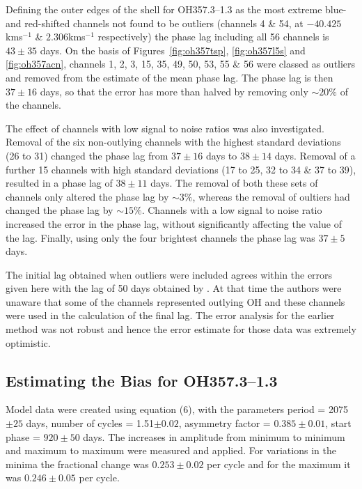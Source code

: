 \documentclass[usenatbib,usegraphicx]{mn2e}
\begin{document}
Defining the outer edges of the shell for OH357.3--1.3 as the most extreme
blue- and red-shifted channels not found to be outliers (channels 4 \& 54,
at $-40.425$kms$^{-1}$ \& $2.306$kms$^{-1}$ respectively) the phase lag
including all 56 channels is $43\pm35$ days. On the basis of
Figures~\ref{fig:oh357tsp}, \ref{fig:oh357l5s} and \ref{fig:oh357acn},
channels 1, 2, 3, 15, 35, 49, 50, 53, 55 \& 56 were classed as outliers and
removed from the estimate of the mean phase lag.  The phase lag is then
$37\pm16$ days, so that the error has more than halved by removing only
$\sim20\%$ of the channels.


The effect of channels with low signal to noise ratios was also
investigated.  Removal of the six non-outlying channels with the highest
standard deviations (26 to 31) changed the phase lag from $37\pm16$ days to
$38\pm14$ days.  Removal of a further 15 channels with high standard
deviations (17 to 25, 32 to 34 \& 37 to 39), resulted in a phase lag of
$38\pm11$ days. The removal of both these sets of channels only altered the
phase lag by $\sim3\%$, whereas the removal of oultiers had changed the
phase lag by $\sim15\%$.  Channels with a low signal to noise ratio
increased the error in the phase lag, without significantly affecting the
value of the lag.  Finally, using only the four brightest channels the phase
lag was $37\pm5$ days.

The initial lag obtained when outliers were included agrees within the
errors given here with the lag of 50 days obtained by \citet{West92}.  At
that time the authors were unaware that some of the channels represented
outlying OH and these channels were used in the calculation of the final
lag.  The error analysis for the earlier method was not robust and hence the
error estimate for those data was extremely optimistic.


\subsection{Estimating the Bias for OH357.3--1.3}

Model data were created using equation (6), with the parameters period =
2075$\pm25$ days, number of cycles = 1.51$\pm0.02$, asymmetry factor =
$0.385\pm0.01$, start phase = $920\pm50$ days.  The increases in amplitude
from minimum to minimum and maximum to maximum were measured and applied. 
For variations in the minima the fractional change was $0.253\pm0.02$ per
cycle and for the maximum it was $0.246\pm0.05$ per cycle.
\end{document}
